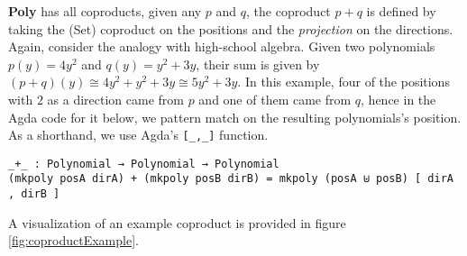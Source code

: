 \textbf{Poly} has all coproducts, given any $p$ and $q$, the coproduct $p+q$ is defined by taking the (Set) coproduct on the positions and the \textit{projection} on the directions. Again, consider the analogy with high-school algebra. Given two polynomials $p(y) = 4y^2$ and $q(y) = y^2 + 3y$, their sum is given by $(p + q)(y) \cong 4y^2 + y^2 + 3y \cong 5y^2 + 3y$. In this example, four of the positions with $2$ as a direction came from $p$ and one of them came from $q$, hence in the Agda code for it below, we pattern match on the resulting polynomials's position. As a shorthand, we use Agda's \texttt{[_,_]} function.

\begin{verbatim}
_+_ : Polynomial → Polynomial → Polynomial
(mkpoly posA dirA) + (mkpoly posB dirB) = mkpoly (posA ⊎ posB) [ dirA , dirB ]
\end{verbatim}

A visualization of an example coproduct is provided in figure \ref{fig:coproductExample}.

